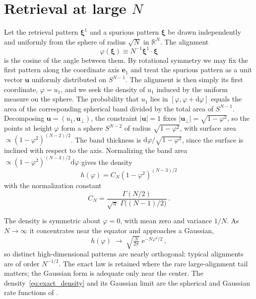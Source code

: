 \documentclass[letterpaper]{article} %
\newcommand{\bxi}{\boldsymbol{\xi}}
\newcommand{\e}{{\mathrm{e}}}
\newcommand{\dd}{{\mathrm{d}}}
\begin{document}
\section{Retrieval at large $N$}
\label{sec:theory}

Let the retrieval pattern $\bxi^1$ and a spurious pattern $\bxi$ be drawn independently
and uniformly from the sphere of radius $\sqrt N$ in $\mathbb{R}^N$. The alignment
\begin{equation}
    \varphi(\bxi) \equiv N^{-1} \bxi^1\cdot\bxi
\end{equation}
is the cosine of the angle between them. By rotational symmetry we may fix the first pattern
along the coordinate axis $\bm e_1$ and treat the spurious pattern as a unit vector $\bm u$
uniformly distributed on $S^{N-1}$.
The alignment is then simply its first coordinate, $\varphi=u_1$, and we seek the density of 
$u_1$ induced by the uniform measure on the sphere.
The probability that $u_1$ lies in $[\varphi,\varphi+\dd\varphi]$ equals the area of the corresponding 
spherical band divided by the total area of $S^{N-1}$. Decomposing $\bm u=(u_1,\bm u_\perp)$, 
the constraint $|\bm u|=1$ fixes $|\bm u_\perp|=\sqrt{1-\varphi^2}$, so the points at height 
$\varphi$ form a sphere $S^{N-2}$ of radius $\sqrt{1-\varphi^2}$, with surface area
$\propto (1-\varphi^2)^{(N-2)/2}$. The band thickness is $\dd\varphi/\sqrt{1-\varphi^2}$, 
since the surface is inclined with respect to the axis. Normalizing the band area
$\propto(1-\varphi^2)^{(N-3)/2}\dd\varphi$ gives the density
\begin{equation}
h(\varphi)=C_N(1-\varphi^2)^{(N-3)/2}
\label{eq:exact_density}
\end{equation}
with the normalization constant
\begin{equation}
C_N=\frac{\Gamma(N/2)}{\sqrt\pi\;\Gamma\!\big((N-1)/2\big)}\,.
\end{equation}

The density is symmetric about $\varphi=0$, with mean zero and variance $1/N$. As $N\to\infty$ it 
concentrates near the equator and approaches a Gaussian,
\begin{equation}
    h(\varphi)\;\longrightarrow \;\sqrt{\tfrac{N}{2\pi}} \; \e^{-N\varphi^2/2}\,,
    \label{eq:gaussian} 
\end{equation}
so distinct high-dimensional patterns are nearly orthogonal: typical alignments are of order $N^{-1/2}$. 
The exact law is retained where the rare large-alignment tail matters;
the Gaussian form is adequate only near the center.
The density~\eqref{eq:exact_density} and its Gaussian limit are the spherical
and Gaussian rate functions of \citet{lucibello2024exponential}.
\end{document}
